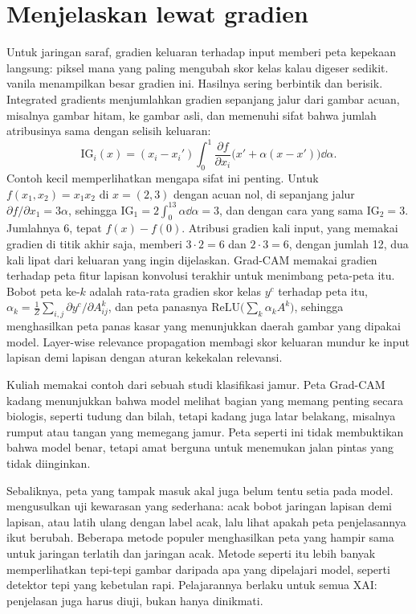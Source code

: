 \section{Menjelaskan lewat gradien}

Untuk jaringan saraf, gradien keluaran terhadap input memberi peta kepekaan langsung: piksel mana yang
paling mengubah skor kelas kalau digeser sedikit.  vanila \citep{simonyan2014}
menampilkan besar gradien ini. Hasilnya sering berbintik dan berisik. Integrated gradients
\citep{sundararajan2017} menjumlahkan gradien sepanjang jalur dari gambar acuan, misalnya gambar hitam,
ke gambar asli, dan memenuhi sifat bahwa jumlah atribusinya sama dengan selisih keluaran:
\begin{equation}
\mathrm{IG}_i(x)=(x_i-x_i')\int_0^1\frac{\partial f}{\partial x_i}\big(x'+\alpha(x-x')\big)\dd\alpha .
\end{equation}
Contoh kecil memperlihatkan mengapa sifat ini penting. Untuk $f(x_1,x_2)=x_1x_2$ di $x=(2,3)$ dengan acuan nol, di sepanjang
jalur $\partial f/\partial x_1=3\alpha$, sehingga $\mathrm{IG}_1=2\int_0^13\alpha\dd\alpha=3$, dan dengan cara yang sama
$\mathrm{IG}_2=3$. Jumlahnya 6, tepat $f(x)-f(0)$. Atribusi gradien kali input, yang memakai gradien di titik akhir saja,
memberi $3\cdot2=6$ dan $2\cdot3=6$, dengan jumlah 12, dua kali lipat dari keluaran yang ingin dijelaskan. Grad-CAM
\citep{selvaraju2017} memakai gradien terhadap peta fitur lapisan konvolusi terakhir untuk menimbang
peta-peta itu. Bobot peta ke-$k$ adalah rata-rata gradien skor kelas $y^c$ terhadap peta itu,
$\alpha_k=\tfrac1Z\sum_{i,j}\partial y^c/\partial A^k_{ij}$, dan peta panasnya $\mathrm{ReLU}\big(\sum_k\alpha_kA^k\big)$, sehingga menghasilkan peta panas kasar yang menunjukkan daerah gambar yang dipakai
model. Layer-wise relevance propagation \citep{bach2015} membagi skor keluaran mundur ke input
lapisan demi lapisan dengan aturan kekekalan relevansi.

Kuliah memakai contoh dari sebuah studi klasifikasi jamur. Peta Grad-CAM kadang menunjukkan bahwa model
melihat bagian yang memang penting secara biologis, seperti tudung dan bilah, tetapi kadang juga
latar belakang, misalnya rumput atau tangan yang memegang jamur. Peta seperti ini tidak membuktikan
bahwa model benar, tetapi amat berguna untuk menemukan jalan pintas yang tidak diinginkan.

Sebaliknya, peta yang tampak masuk akal juga belum tentu setia pada model. \citet{adebayo2018} mengusulkan uji kewarasan
yang sederhana: acak bobot jaringan lapisan demi lapisan, atau latih ulang dengan label acak, lalu lihat apakah peta
penjelasannya ikut berubah. Beberapa metode populer menghasilkan peta yang hampir sama untuk jaringan terlatih dan
jaringan acak. Metode seperti itu lebih banyak memperlihatkan tepi-tepi gambar daripada apa yang dipelajari model,
seperti detektor tepi yang kebetulan rapi. Pelajarannya berlaku untuk semua XAI: penjelasan juga harus diuji, bukan
hanya dinikmati.

